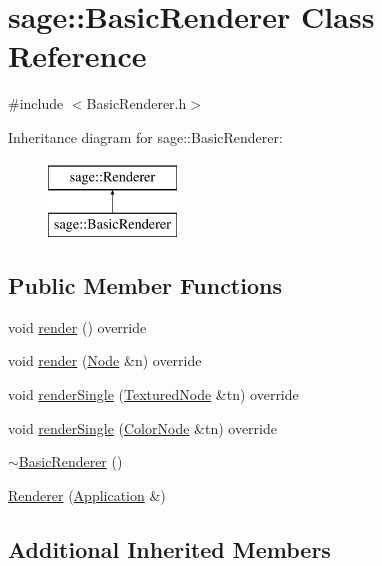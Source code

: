 \hypertarget{classsage_1_1BasicRenderer}{}\section{sage\+::Basic\+Renderer Class Reference}
\label{classsage_1_1BasicRenderer}


{\ttfamily \#include $<$Basic\+Renderer.\+h$>$}

Inheritance diagram for sage\+::Basic\+Renderer\+:\begin{figure}[H]
\begin{center}
\leavevmode
\includegraphics[height=2.000000cm]{classsage_1_1BasicRenderer}
\end{center}
\end{figure}
\subsection*{Public Member Functions}
\begin{DoxyCompactItemize}
\item 
void \mbox{\hyperlink{classsage_1_1BasicRenderer_a127bbe33d8ef13fc64ff2e3943c0636b}{render}} () override
\item 
void \mbox{\hyperlink{classsage_1_1BasicRenderer_a098449e7b2b967968baaec113b53d653}{render}} (\mbox{\hyperlink{classsage_1_1Node}{Node}} \&n) override
\item 
void \mbox{\hyperlink{classsage_1_1BasicRenderer_a405afdd4975fb1e8c37d6b3396f3ea18}{render\+Single}} (\mbox{\hyperlink{classsage_1_1TexturedNode}{Textured\+Node}} \&tn) override
\item 
void \mbox{\hyperlink{classsage_1_1BasicRenderer_a970280d2d704dea463ba0adbca84835f}{render\+Single}} (\mbox{\hyperlink{classsage_1_1ColorNode}{Color\+Node}} \&tn) override
\item 
\mbox{\hyperlink{classsage_1_1BasicRenderer_a9808c8f288a5ab275076223370c4aa00}{$\sim$\+Basic\+Renderer}} ()
\item 
\mbox{\hyperlink{classsage_1_1BasicRenderer_aea1ceb080017504798f28cde4d45502e}{Renderer}} (\mbox{\hyperlink{classsage_1_1Application}{Application}} \&)
\end{DoxyCompactItemize}
\subsection*{Additional Inherited Members}


